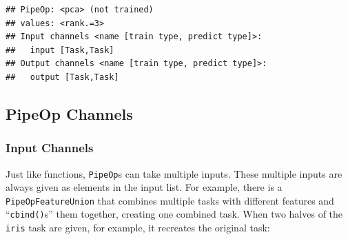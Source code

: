\documentclass[]{scrbook}
\newenvironment{Shaded}{\begin{snugshade}}{\end{snugshade}}
\newcommand{\DataTypeTok}[1]{\textcolor[rgb]{0.13,0.29,0.53}{#1}}
\newcommand{\DecValTok}[1]{\textcolor[rgb]{0.00,0.00,0.81}{#1}}
\newcommand{\KeywordTok}[1]{\textcolor[rgb]{0.13,0.29,0.53}{\textbf{#1}}}
\newcommand{\NormalTok}[1]{#1}
\newcommand{\OperatorTok}[1]{\textcolor[rgb]{0.81,0.36,0.00}{\textbf{#1}}}
\newcommand{\StringTok}[1]{\textcolor[rgb]{0.31,0.60,0.02}{#1}}
\renewenvironment{Shaded} {\begin{snugshade}\small} {\end{snugshade}}
\begin{document}
\begin{verbatim}
## PipeOp: <pca> (not trained)
## values: <rank.=3>
## Input channels <name [train type, predict type]>:
##   input [Task,Task]
## Output channels <name [train type, predict type]>:
##   output [Task,Task]
\end{verbatim}

\hypertarget{pipeop-channels}{%
\subsection{PipeOp Channels}\label{pipeop-channels}}

\hypertarget{input-channels}{%
\subsubsection{Input Channels}\label{input-channels}}

Just like functions, \texttt{PipeOp}s can take multiple inputs.
These multiple inputs are always given as elements in the input list.
For example, there is a \texttt{PipeOpFeatureUnion} that combines multiple tasks with different features and ``\texttt{cbind()}s'' them together, creating one combined task.
When two halves of the \texttt{iris} task are given, for example, it recreates the original task:

\begin{Shaded}
\end{Shaded}
\end{document}
